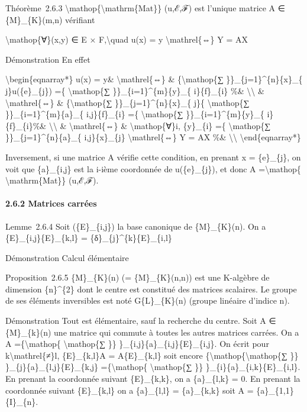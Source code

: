 \documentclass[]{article}
\begin{document}
Théorème~2.6.3 \textbackslash{}mathop\{\textbackslash{}mathrm\{Mat\}\}
(u,ℰ,ℱ) est l'unique matrice A ∈ \{M\}\_\{K\}(m,n) vérifiant

\textbackslash{}mathop\{∀\}(x,y) ∈ E × F,\textbackslash{}quad u(x) = y
\textbackslash{}mathrel\{⇔\} Y = AX

Démonstration En effet

\textbackslash{}begin\{eqnarray*\} u(x) = y\&
\textbackslash{}mathrel\{⇔\} \& \{\textbackslash{}mathop\{∑
\}\}\_\{j=1\}\^{}\{n\}\{x\}\_\{ j\}u(\{e\}\_\{j\}) =\{
\textbackslash{}mathop\{∑ \}\}\_\{i=1\}\^{}\{m\}\{y\}\_\{
i\}\{f\}\_\{i\} \%\& \textbackslash{}\textbackslash{} \&
\textbackslash{}mathrel\{⇔\} \& \{\textbackslash{}mathop\{∑
\}\}\_\{j=1\}\^{}\{n\}\{x\}\_\{ j\}\{ \textbackslash{}mathop\{∑
\}\}\_\{i=1\}\^{}\{m\}\{a\}\_\{ i,j\}\{f\}\_\{i\} =\{
\textbackslash{}mathop\{∑ \}\}\_\{i=1\}\^{}\{m\}\{y\}\_\{
i\}\{f\}\_\{i\}\%\& \textbackslash{}\textbackslash{} \&
\textbackslash{}mathrel\{⇔\} \& \textbackslash{}mathop\{∀\}i,
\{y\}\_\{i\} =\{ \textbackslash{}mathop\{∑
\}\}\_\{j=1\}\^{}\{n\}\{a\}\_\{ i,j\}\{x\}\_\{j\}
\textbackslash{}mathrel\{⇔\} Y = AX \%\&
\textbackslash{}\textbackslash{} \textbackslash{}end\{eqnarray*\}

Inversement, si une matrice A vérifie cette condition, en prenant x =
\{e\}\_\{j\}, on voit que \{a\}\_\{i,j\} est la i-ième coordonnée de
u(\{e\}\_\{j\}), et donc A =\textbackslash{}mathop\{
\textbackslash{}mathrm\{Mat\}\} (u,ℰ,ℱ).

\paragraph{2.6.2 Matrices carrées}

Lemme~2.6.4 Soit (\{E\}\_\{i,j\}) la base canonique de \{M\}\_\{K\}(n).
On a \{E\}\_\{i,j\}\{E\}\_\{k,l\} = \{δ\}\_\{j\}\^{}\{k\}\{E\}\_\{i,l\}

Démonstration Calcul élémentaire

Proposition~2.6.5 \{M\}\_\{K\}(n) (= \{M\}\_\{K\}(n,n)) est une
K-algèbre de dimension \{n\}\^{}\{2\} dont le centre est constitué des
matrices scalaires. Le groupe de ses éléments inversibles est noté
G\{L\}\_\{K\}(n) (groupe linéaire d'indice n).

Démonstration Tout est élémentaire, sauf la recherche du centre. Soit A
∈ \{M\}\_\{k\}(n) une matrice qui commute à toutes les autres matrices
carrées. On a A =\{\textbackslash{}mathop\{ \textbackslash{}mathop\{∑
\}\} \}\_\{i,j\}\{a\}\_\{i,j\}\{E\}\_\{i,j\}. On écrit pour
k\textbackslash{}mathrel\{≠\}l, \{E\}\_\{k,l\}A = A\{E\}\_\{k,l\} soit
encore \{\textbackslash{}mathop\{\textbackslash{}mathop\{∑ \}\}
\}\_\{j\}\{a\}\_\{l,j\}\{E\}\_\{k,j\} =\{\textbackslash{}mathop\{
\textbackslash{}mathop\{∑ \}\} \}\_\{i\}\{a\}\_\{i,k\}\{E\}\_\{i,l\}. En
prenant la coordonnée suivant \{E\}\_\{k,k\}, on a \{a\}\_\{l,k\} = 0.
En prenant la coordonnée suivant \{E\}\_\{k,l\} on a \{a\}\_\{l,l\} =
\{a\}\_\{k,k\} soit A = \{a\}\_\{1,1\}\{I\}\_\{n\}.
\end{document}
